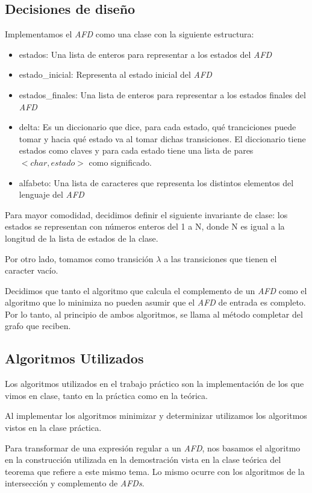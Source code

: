 \subsection{Decisiones de diseño}
Implementamos el \emph{AFD} como una clase con la siguiente estructura:

\begin{itemize}
	\item estados: Una lista de enteros para representar a los estados del \emph{AFD}
	\item estado\_inicial: Representa al estado inicial del \emph{AFD}
	\item estados\_finales: Una lista de enteros para representar a los estados finales del \emph{AFD}
	\item delta: Es un diccionario que dice, para cada estado, qué tranciciones puede tomar y hacia qué estado va al tomar dichas transiciones. El diccionario tiene estados como claves y para cada estado tiene una lista de pares $<char, estado>$ como significado.
	\item alfabeto: Una lista de caracteres que representa los distintos elementos del lenguaje del \emph{AFD}
\end{itemize}

Para mayor comodidad, decidimos definir el siguiente invariante de clase: los estados se representan con números enteros del 1 a N, donde N es igual a la longitud de la lista de estados de la clase.

Por otro lado, tomamos como transición $\lambda$ a las transiciones que tienen el caracter vacío.

Decidimos que tanto el algoritmo que calcula el complemento de un \emph{AFD} como el algoritmo que lo minimiza no pueden asumir que el \emph{AFD} de entrada es completo. Por lo tanto, al principio de ambos algoritmos, se llama al método completar del grafo que reciben.

\subsection{Algoritmos Utilizados}

Los algoritmos utilizados en el trabajo práctico son la implementación de los que vimos en clase, tanto en la práctica como en la teórica.

Al implementar los algoritmos minimizar y determinizar utilizamos los algoritmos vistos en la clase práctica.

Para transformar de una expresión regular a un \emph{AFD}, nos basamos el algoritmo en la construcción utilizada en la demostración vista en la clase teórica del teorema que refiere a este mismo tema. Lo mismo ocurre con los algoritmos de la intersección y complemento de \emph{AFDs}.

